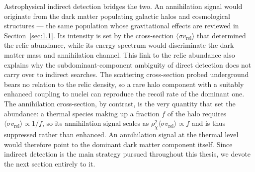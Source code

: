 Astrophysical indirect detection bridges the two.
An annihilation signal would originate from the dark matter populating galactic halos and cosmological structures --- the same population whose gravitational effects are reviewed in Section~\ref{sec:1.1}.
Its intensity is set by the cross-section $\langle \sigma v_\text{rel} \rangle$ that determined the relic abundance, while its energy spectrum would discriminate the dark matter mass and annihilation channel.
This link to the relic abundance also explains why the subdominant-component ambiguity of direct detection does not carry over to indirect searches.
The scattering cross-section probed underground bears no relation to the relic density, so a rare halo component with a suitably enhanced coupling to nuclei can reproduce the recoil rate of the dominant one.
The annihilation cross-section, by contrast, is the very quantity that set the abundance: a thermal species making up a fraction $f$ of the halo requires $\langle \sigma v_\text{rel} \rangle \propto 1/f$, so its annihilation signal scales as $\rho_\chi^2 \langle \sigma v_\text{rel} \rangle \propto f$ and is thus suppressed rather than enhanced.
An annihilation signal at the thermal level would therefore point to the dominant dark matter component itself.
Since indirect detection is the main strategy pursued throughout this thesis, we devote the next section entirely to it.
